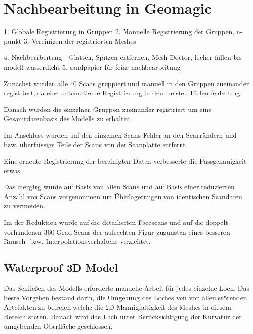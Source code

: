 \documentclass[]{article}
\begin{document}
\section{Nachbearbeitung in Geomagic} %

1. Globale Registrierung in Gruppen
2. Manuelle Registrierung der Gruppen, n-punkt
3. Vereinigen der registrierten Meshes

4. Nachbearbeitung
- Glätten, Spitzen entfernen, Mesh Doctor, löcher füllen
bis modell wasserdicht
5. sandpapier für feine nachbearbeitung


Zunächst wurden alle $40$ Scans gruppiert und manuell in den Gruppen zueinander registriert, da eine automatische Registrierung in den meisten Fällen fehlschlug.

Danach wurden die einzelnen Gruppen zueinander registriert um eine Gesamtdatenbasis des Modells zu erhalten.

Im Anschluss wurden auf den einzelnen Scans Fehler an den Scanrändern und bzw. überflüssige Teile der Scans von der Scanplatte entfernt.

Eine erneute Registrierung der bereinigten Daten verbesserte die Passgenauigkeit etwas. 

Das merging wurde auf Basis von allen Scans und auf Basis einer reduzierten Anzahl von Scans vorgenommen um Überlagerungen von identischen Scandaten zu vermeiden.

Im der Reduktion wurde auf die detailierten Facescans und auf die doppelt vorhandenen 360 Grad Scans der aufrechten Figur zugunsten eines besseren Rausch- bzw. Interpolationsverhaltens verzichtet.

\subsection{Waterproof 3D Model}

Das Schließen des Modells erforderte manuelle Arbeit für jedes einzelne Loch. Das beste Vorgehen bestand darin, die Umgebung des Loches von von allen störenden Artefakten zu befreien welche die 2D Mannigfaltigkeit des Meshes in diesem Bereich stören. Danach wird das Loch unter Berücksichtigung der Kurvatur der umgebenden Oberfläche geschlossen.

\subsection{}
\subsection{}
\end{document}
